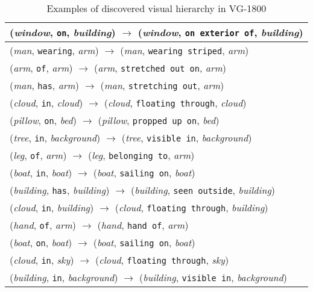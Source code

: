 \documentclass[runningheads]{llncs}
\begin{document}
{
\begin{longtable}{ l }
\caption{Examples of discovered visual hierarchy in VG-1800}
\label{table:vg1800_vis_h}\\
\hline
(\textit{window}, \texttt{on}, \textit{building}) $\rightarrow$ (\textit{window}, \texttt{on exterior of}, \textit{building}) \\ \hline
(\textit{man}, \texttt{wearing}, \textit{arm}) $\rightarrow$ (\textit{man}, \texttt{wearing striped}, \textit{arm}) \\ \hline
(\textit{arm}, \texttt{of}, \textit{arm}) $\rightarrow$ (\textit{arm}, \texttt{stretched out on}, \textit{arm}) \\ \hline
(\textit{man}, \texttt{has}, \textit{arm}) $\rightarrow$ (\textit{man}, \texttt{stretching out}, \textit{arm}) \\ \hline
(\textit{cloud}, \texttt{in}, \textit{cloud}) $\rightarrow$ (\textit{cloud}, \texttt{floating through}, \textit{cloud}) \\ \hline
(\textit{pillow}, \texttt{on}, \textit{bed}) $\rightarrow$ (\textit{pillow}, \texttt{propped up on}, \textit{bed}) \\ \hline
(\textit{tree}, \texttt{in}, \textit{background}) $\rightarrow$ (\textit{tree}, \texttt{visible in}, \textit{background}) \\ \hline
(\textit{leg}, \texttt{of}, \textit{arm}) $\rightarrow$ (\textit{leg}, \texttt{belonging to}, \textit{arm}) \\ \hline
(\textit{boat}, \texttt{in}, \textit{boat}) $\rightarrow$ (\textit{boat}, \texttt{sailing on}, \textit{boat}) \\ \hline
(\textit{building}, \texttt{has}, \textit{building}) $\rightarrow$ (\textit{building}, \texttt{seen outside}, \textit{building}) \\ \hline
(\textit{cloud}, \texttt{in}, \textit{building}) $\rightarrow$ (\textit{cloud}, \texttt{floating through}, \textit{building}) \\ \hline
(\textit{hand}, \texttt{of}, \textit{arm}) $\rightarrow$ (\textit{hand}, \texttt{hand of}, \textit{arm}) \\ \hline
(\textit{boat}, \texttt{on}, \textit{boat}) $\rightarrow$ (\textit{boat}, \texttt{sailing on}, \textit{boat}) \\ \hline
(\textit{cloud}, \texttt{in}, \textit{sky}) $\rightarrow$ (\textit{cloud}, \texttt{floating through}, \textit{sky}) \\ \hline
(\textit{building}, \texttt{in}, \textit{background}) $\rightarrow$ (\textit{building}, \texttt{visible in}, \textit{background}) \\ \hline

\end{longtable}}
\end{document}
